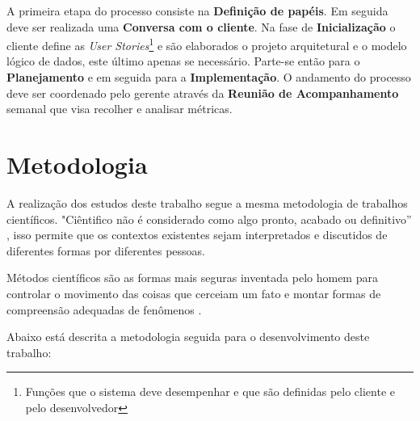 \documentclass[a4paper,12pt]{monografia}
\begin{document}
A primeira etapa do processo consiste na \textbf{Definição de papéis}. Em seguida deve ser realizada uma \textbf{Conversa com o cliente}. Na fase de \textbf{Inicialização} o cliente define as \textit{User Stories}\footnote{Funções que o sistema deve desempenhar e que são definidas pelo cliente e pelo desenvolvedor} e são elaborados o projeto arquitetural e o modelo lógico de dados, este último apenas se necessário. Parte-se então para o \textbf{Planejamento} e em seguida para a \textbf{Implementação}. O andamento do processo deve ser coordenado pelo gerente através da \textbf{Reunião de Acompanhamento} semanal que visa recolher e analisar métricas.



\chapter{Metodologia} %
\label{cha:metodologia}

A realização dos estudos deste trabalho segue a mesma metodologia de trabalhos científicos. "Ciêntifico não é considerado como algo pronto, acabado ou definitivo” \cite{sa2010anuario}, isso permite que os contextos existentes sejam interpretados e discutidos de diferentes formas por diferentes pessoas.

Métodos científicos são as formas mais seguras inventada pelo homem para controlar o movimento das coisas que cerceiam um fato e montar formas de compreensão adequadas de fenômenos \cite{bunge}.

Abaixo está descrita a metodologia seguida para o desenvolvimento deste trabalho:
\end{document}
